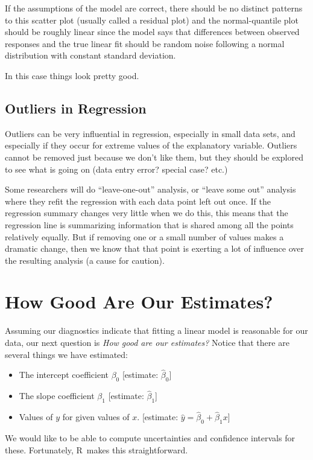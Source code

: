 \documentclass[twoside]{book}\usepackage[]{graphicx}\usepackage[]{xcolor}
\def\R{{\sf R}}
\begin{document}
If the assumptions of the model are correct, there should be no distinct patterns to this scatter
plot (usually called a residual plot) and the normal-quantile plot should be roughly linear
since the model says that differences between observed responses and the true linear fit
should be random noise following a normal distribution with constant standard deviation.

In this case things look pretty good. 

\subsection{Outliers in Regression}

Outliers can be very influential in regression, especially in small data sets,
and especially if they occur for extreme values of the explanatory variable.
Outliers cannot be removed just because we don't like them, but they should be
explored to see what is going on (data entry error? special case? etc.)

Some researchers will do ``leave-one-out'' analysis, or ``leave some out'' analysis
where they refit the regression with each data point left out once.  If the regression
summary changes very little when we do this, this means that the regression line
is summarizing information that is shared among all the points relatively equally.
But if removing one or a small number of values makes a dramatic change, then
we know that that point is exerting a lot of influence over the resulting
analysis (a cause for caution).   

\section{How Good Are Our Estimates?}
Assuming our diagnostics indicate that fitting a linear model is reasonable for our data,
our next question is \emph{How good are our estimates?}
Notice that there are several things we have estimated:
\begin{itemize}
	\item The intercept coefficient $\beta_0$ 
		[estimate: $\hat \beta_0$]
	\item The slope coefficient $\beta_1$ 
		[estimate: $\hat \beta_1$]
	\item Values of $y$ for given values of $x$. 
		[estimate: $\hat y = \hat \beta_0 + \hat \beta_1 x$]
\end{itemize}

We would like to be able to compute uncertainties and confidence intervals for these.
Fortunately, \R\ makes this straightforward.
\end{document}
